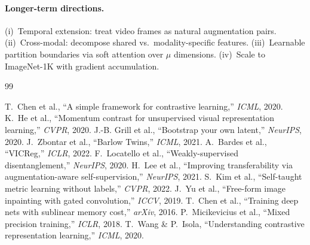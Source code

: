 \documentclass[10pt,twocolumn]{article}
\begin{document}
\paragraph{Longer-term directions.}
(i)~Temporal extension: treat video frames as natural augmentation pairs.
(ii)~Cross-modal: decompose shared vs.\ modality-specific features.
(iii)~Learnable partition boundaries via soft attention over $\mu$ dimensions.
(iv)~Scale to ImageNet-1K with gradient accumulation.


\begin{thebibliography}{99}

 T.~Chen et al., ``A simple framework for contrastive learning,'' \emph{ICML}, 2020.
 K.~He et al., ``Momentum contrast for unsupervised visual representation learning,'' \emph{CVPR}, 2020.
 J.-B. Grill et al., ``Bootstrap your own latent,'' \emph{NeurIPS}, 2020.
 J.~Zbontar et al., ``Barlow Twins,'' \emph{ICML}, 2021.
 A.~Bardes et al., ``VICReg,'' \emph{ICLR}, 2022.
 F.~Locatello et al., ``Weakly-supervised disentanglement,'' \emph{NeurIPS}, 2020.
 H.~Lee et al., ``Improving transferability via augmentation-aware self-supervision,'' \emph{NeurIPS}, 2021.
 S.~Kim et al., ``Self-taught metric learning without labels,'' \emph{CVPR}, 2022.
 J.~Yu et al., ``Free-form image inpainting with gated convolution,'' \emph{ICCV}, 2019.
 T.~Chen et al., ``Training deep nets with sublinear memory cost,'' \emph{arXiv}, 2016.
 P.~Micikevicius et al., ``Mixed precision training,'' \emph{ICLR}, 2018.
 T.~Wang \& P.~Isola, ``Understanding contrastive representation learning,'' \emph{ICML}, 2020.

\end{thebibliography}
\end{document}

